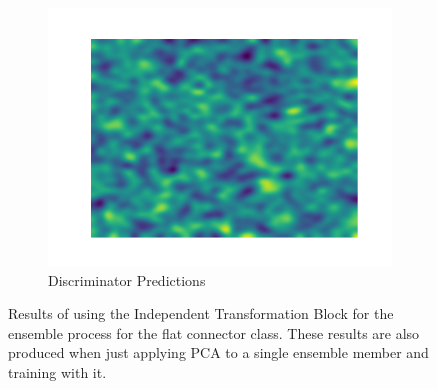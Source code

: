 \begin{figure}[htbp]
\begin{subfigure}[b]{0.3\textwidth}
    \end{subfigure}
    \begin{subfigure}[b]{0.3\textwidth}
        \centering
        \includegraphics[width=\textwidth]{figures/pca_results/pca_res.png}
        \caption*{Discriminator Predictions}

    \end{subfigure}
    \caption{Results of using the Independent Transformation Block \cite{EnsembleHeller2023} for the ensemble process for the flat connector class. 
             These results are also produced when just applying PCA to a single ensemble member and training with it.}
    \label{fig:pca_res}
\end{figure}